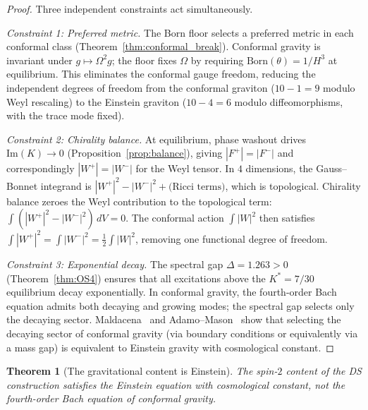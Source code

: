 \documentclass[11pt,a4paper]{article}
\newtheorem{theorem}{Theorem}[section]
\theoremstyle{definition}
\theoremstyle{remark}
\begin{document}
\begin{proof}
Three independent constraints act simultaneously.

\emph{Constraint 1: Preferred metric.} The Born floor selects a preferred metric in each conformal class (Theorem~\ref{thm:conformal_break}). Conformal gravity is invariant under $g\mapsto\Omega^2 g$; the floor fixes $\Omega$ by requiring $\mathrm{Born}(\theta)=1/H^3$ at equilibrium. This eliminates the conformal gauge freedom, reducing the independent degrees of freedom from the conformal graviton ($10-1=9$ modulo Weyl rescaling) to the Einstein graviton ($10-4=6$ modulo diffeomorphisms, with the trace mode fixed).

\emph{Constraint 2: Chirality balance.} At equilibrium, phase washout drives $\mathrm{Im}(K)\to 0$ (Proposition~\ref{prop:balance}), giving $|F^+|=|F^-|$ and correspondingly $|W^+|=|W^-|$ for the Weyl tensor. In $4$ dimensions, the Gauss--Bonnet integrand is $|W^+|^2-|W^-|^2+\text{(Ricci terms)}$, which is topological. Chirality balance zeroes the Weyl contribution to the topological term: $\int(|W^+|^2-|W^-|^2)\,dV=0$. The conformal action $\int|W|^2$ then satisfies $\int|W^+|^2=\int|W^-|^2=\frac{1}{2}\int|W|^2$, removing one functional degree of freedom.

\emph{Constraint 3: Exponential decay.} The spectral gap $\Delta=1.263>0$ (Theorem~\ref{thm:OS4}) ensures that all excitations above the $K^*=7/30$ equilibrium decay exponentially. In conformal gravity, the fourth-order Bach equation admits both decaying and growing modes; the spectral gap selects only the decaying sector. Maldacena~\cite{Maldacena2011} and Adamo--Mason~\cite{AdamoMason2014} show that selecting the decaying sector of conformal gravity (via boundary conditions or equivalently via a mass gap) is equivalent to Einstein gravity with cosmological constant.
\end{proof}

\begin{theorem}[The gravitational content is Einstein]\label{thm:einstein}
The spin-$2$ content of the DS construction satisfies the Einstein equation with cosmological constant, not the fourth-order Bach equation of conformal gravity.
\end{theorem}
\end{document}
